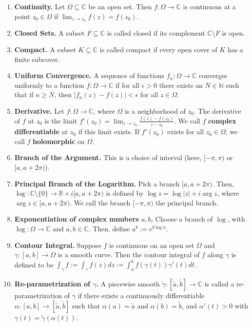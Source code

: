 \documentclass[11pt]{article}
\theoremstyle{definition}
\theoremstyle{named}
\begin{document}
\begin{enumerate}
    \item \textbf{Continuity. } Let $\Omega \subseteq \mathbb{C}$ be an open set. Then $f: \Omega \to \mathbb{C}$ is continuous at a point $z_0 \in \Omega$ if $\lim_{z \to z_0} f(z) = f(z_0)$. 
    \item \textbf{Closed Sets. } A subset $F \subseteq \mathbb{C}$ is called closed if its complement $\mathbb{C} \setminus F$ is open. 
    \item \textbf{Compact. } A subset $K \subseteq \mathbb{C}$ is called compact if every open cover of $K$ has a finite subcover. 
    \item \textbf{Uniform Convergence. } A sequence of functions $f_n: \Omega \to \mathbb{C}$ converges uniformly to a function $f: \Omega \to \mathbb{C}$ if for all $\epsilon > 0$ there exists an $N \in \mathbb{N}$ such that if $n \geq N$, then $|f_n(z) - f(z)| < \epsilon$ for all $z \in \Omega$. 
    \item \textbf{Derivative. } Let $f: \Omega \to \mathbb{C}$, where $\Omega$ is a neighborhood of $z_0$. The derivative of $f$ at $z_0$ is the limit $f'(z_0) = \lim_{z \to z_0} \frac{f(z) - f(z_0)}{z - z_0}$. We call $f$ \textbf{complex differentiable} at $z_0$ if this limit exists. If $f'(z_0)$ exists for all $z_0 \in \Omega$, we call $f$ \textbf{holomorphic} on $\Omega$. 
    \item \textbf{Branch of the Argument. } This is a choice of interval (here, $[-\pi,\pi)$ or $[a,a+2\pi)$). 
    \item \textbf{Principal Branch of the Logarithm. } Pick a branch $[a, a+2\pi)$. Then, $\log: \mathbb{C} \setminus \{0\} \to \mathbb{R} \times i[a,a+2\pi)$ is defined by $\log z = \log |z| + i\arg z$, where $\arg z \in [a, a+2\pi)$. We call the branch $[-\pi,\pi)$ the principal branch. 
    \item \textbf{Exponentiation of complex numbers $a,b$. } Choose a branch of $\log$, with $\log: \Omega \to \mathbb{C}$ and $a,b \in \mathbb{C}$. Then, define $a^b := e^{b\log a}$. 
    \item \textbf{Contour Integral. } Suppose $f$ is continuous on an open set $\Omega$ and $\gamma: [a,b] \to \Omega$ is a smooth curve. Then the contour integral of $f$ along $\gamma$ is defined to be $\int_{\gamma} f := \int_{\gamma} f(z) dz := \int_{a}^{b}f(\gamma(t))\gamma'(t) dt$. 
    \item \textbf{Re-parametrization of $\gamma$. } A piecewise smooth $\tilde{\gamma}: [\tilde{a}, \tilde{b}] \to \mathbb{C}$ is called a re-parametrization of $\gamma$ if there exists a continuously differentiable $\alpha: [a,b] \to [\tilde{a}, \tilde{b}]$ such that $\alpha(a) = \tilde{a}$ and $\alpha(b) = \tilde{b}$, and $\alpha'(t) > 0$ with $\gamma(t) = \tilde{\gamma}(\alpha(t))$. 

\end{enumerate}
\end{document}
